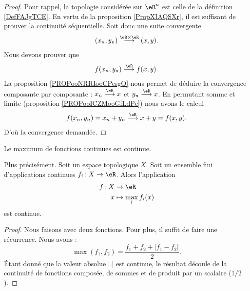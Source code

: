 \begin{proof}
	Pour rappel, la topologie considérée sur \( \eR^n\) est celle de la définition \ref{DefFAJgTCE}. En vertu de la proposition \ref{PropXIAQSXr}, il est suffisant de prouver la continuité séquentielle. Soit donc une suite convergente
	\begin{equation}
		(x_n,y_n)\stackrel{\eR\times \eR}{\longrightarrow}(x,y).
	\end{equation}
	Nous devons prouver que
	\begin{equation}
		f(x_n,y_n)\stackrel{\eR}{\longrightarrow}f(x,y).
	\end{equation}
	La proposition \ref{PROPooNRRIooCPesgO} nous permet de déduire la convergence composante par composante : \( x_n\stackrel{\eR}{\longrightarrow}x\) et \( y_n\stackrel{\eR}{\longrightarrow}x\). En permutant somme et limite (proposition \ref{PROPooICZMooGfLdPc}) nous avons le calcul
	\begin{equation}
		f(x_n,y_n)=x_n+y_n\stackrel{\eR}{\longrightarrow}x+y=f(x,y).
	\end{equation}
	D'où la convergence demandée.
\end{proof}

\begin{proposition}	\label{PROPooQNXVooNtBaxH}
	Le maximum de fonctions continues est continue.

	Plus précisément. Soit un espace topologique \( X\). Soit un ensemble fini d'applications continues \(f_i \colon X\to \eR  \). Alors l'application
	\begin{equation}
		\begin{aligned}
			f\colon X & \to \eR              \\
			x         & \mapsto \max_if_i(x)
		\end{aligned}
	\end{equation}
	est continue.
\end{proposition}

\begin{proof}
	Nous faisons avec deux fonctions. Pour plus, il suffit de faire une récurrence. Nous avons :
	\begin{equation}
		\max(f_1,f_2)=\frac{ f_1+f_2+| f_1-f_2 | }{ 2 }.
	\end{equation}
	Étant donné que la valeur absolue \( | . |\) est continue, le résultat découle de la continuité de fonctions composée, de sommes et de produit par un scalaire (\( 1/2\)).
\end{proof}

